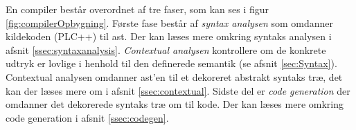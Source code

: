 En compiler består overordnet af tre faser, som kan ses i figur \ref{fig:compilerOpbygning}. Første fase består af \textit{syntax analysen} som omdanner kildekoden (PLC++) til \gls{ast}. Der kan læses mere omkring syntaks analysen i afsnit \ref{ssec:syntaxanalysis}. \textit{Contextual analysen} kontrollere om de konkrete udtryk er lovlige i henhold til den definerede semantik (se afsnit \ref{sec:Syntax}). Contextual analysen omdanner \gls{ast}'en til et dekoreret abstrakt syntaks træ, det kan der læses mere om i afsnit \ref{ssec:contextual}. Sidste del er \textit{code generation} der omdanner det dekorerede syntaks træ om til kode. Der kan læses mere omkring code generation i afsnit \ref{ssec:codegen}.

